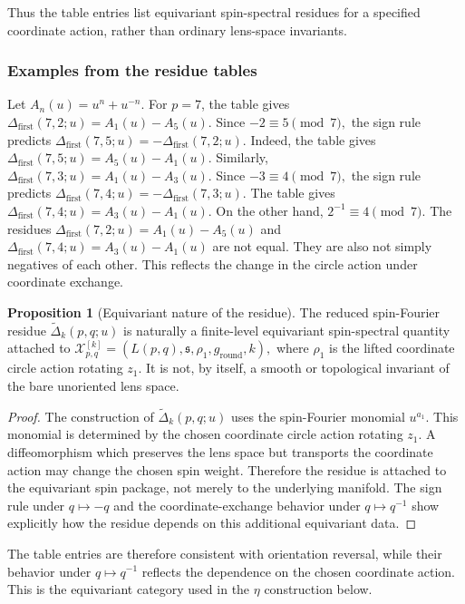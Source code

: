 \documentclass{article}
\theoremstyle{definition}
\newtheorem{proposition}[theorem]{Proposition}
\numberwithin{equation}{section}
\begin{document}
Thus the table entries list equivariant spin-spectral residues for a specified coordinate action, rather than ordinary lens-space invariants.

\subsubsection*{Examples from the residue tables}

Let $A_n(u)=u^n+u^{-n}.$ For $p=7$, the table gives $\Delta_{\text{first}}(7,2;u)=A_1(u)-A_5(u).$ Since $-2\equiv5\pmod7,$ the sign rule predicts $\Delta_{\text{first}}(7,5;u)=-\Delta_{\text{first}}(7,2;u).$ Indeed, the table gives $\Delta_{\text{first}}(7,5;u)=A_5(u)-A_1(u).$ Similarly, $\Delta_{\text{first}}(7,3;u)=A_1(u)-A_3(u).$ Since $-3\equiv4\pmod7,$ the sign rule predicts $\Delta_{\text{first}}(7,4;u)=-\Delta_{\text{first}}(7,3;u).$ The table gives $\Delta_{\text{first}}(7,4;u)=A_3(u)-A_1(u).$ On the other hand, $2^{-1}\equiv4\pmod7.$ The residues $\Delta_{\text{first}}(7,2;u)=A_1(u)-A_5(u)$ and $\Delta_{\text{first}}(7,4;u)=A_3(u)-A_1(u)$ are not equal.  They are also not simply negatives of each other.  This reflects the change in the circle action under coordinate exchange.

\begin{proposition}[Equivariant nature of the residue]
The reduced spin-Fourier residue $\widetilde\Delta_k(p,q;u)$ is naturally a finite-level equivariant spin-spectral quantity attached to $\mathcal X^{[k]}_{p,q}=\left(L(p,q),\mathfrak s,\rho_1,g_{\text{round}},k\right),$ where $\rho_1$ is the lifted coordinate circle action rotating $z_1$.  It is not, by itself, a smooth or topological invariant of the bare unoriented lens space.
\end{proposition}

\begin{proof}
The construction of $\widetilde\Delta_k(p,q;u)$ uses the spin-Fourier monomial $u^{a_1}$.  This monomial is determined by the chosen coordinate circle action rotating $z_1$.  A diffeomorphism which preserves the lens space but transports the coordinate action may change the chosen spin weight.  Therefore the residue is attached to the equivariant spin package, not merely to the underlying manifold.  The sign rule under $q\mapsto -q$ and the coordinate-exchange behavior under $q\mapsto q^{-1}$ show explicitly how the residue depends on this additional equivariant data.
\end{proof}

The table entries are therefore consistent with orientation reversal, while their behavior under $q\mapsto q^{-1}$ reflects the dependence on the chosen coordinate action.  This is the equivariant category used in the $\eta$ construction below.
\end{document}
